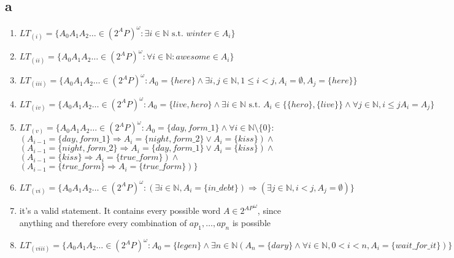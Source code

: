 \documentclass[11pt]{article}
\begin{document}
\subsection{a}
\begin{enumerate}[label=(\roman*)]
\item $LT_{(i)}=\{A_0A_1A_2\dots \in (2^AP)^\omega : \exists i \in \mathbb{N}\text{ s.t. } winter \in A_i\}$
\item $LT_{(ii)}=\{A_0A_1A_2\dots \in (2^AP)^\omega : \forall i \in \mathbb{N}: awesome \in A_i\}$
\item $LT_{(iii)}=\{A_0A_1A_2\dots \in (2^AP)^\omega : A_0 = \{here\} \land \exists i,j \in \mathbb{N}, 1\le i<j, A_i = \emptyset, A_j=\{here\}\}$
\item $LT_{(iv)}=\{A_0A_1A_2\dots \in (2^AP)^\omega : A_0=\{live, hero\} \land \exists i \in \mathbb{N}\text{ s.t. } A_i \in \{\{hero\},\{live\}\} \land \forall j \in \mathbb{N}, i \le j A_i = A_j\}$
\item $LT_{(v)}=\{A_0A_1A_2\dots \in (2^AP)^\omega : A_0 = \{day, form\_1\} \land \forall i \in \mathbb{N}\setminus \{0\}: $\\
\hspace*{1.5cm}$(A_{i-1} = \{day, form\_1\} \Rightarrow A_i = \{night, form\_2\} \lor A_i = \{kiss\}) \land$\\
\hspace*{1.5cm}$(A_{i-1} = \{night, form\_2\} \Rightarrow A_i = \{day, form\_1\} \lor A_i = \{kiss\}) \land$\\
\hspace*{1.5cm}$(A_{i-1}= \{kiss\} \Rightarrow A_i=\{true\_form\})\land$\\
\hspace*{1.5cm}$(A_{i-1}= \{true\_form\} \Rightarrow A_{i}= \{true\_form\})\}$
\item $LT_{(vi)}=\{A_0A_1A_2\dots \in (2^AP)^\omega : (\exists i \in \mathbb{N}, A_i=\{in\_debt\}) \Rightarrow (\exists j \in \mathbb{N}, i < j, A_j = \emptyset)\}$
\item it's a valid statement. It contains every possible word $A \in {2^{AP}}^\omega$, since anything and therefore every combination of $ap_1, \dots , ap_n$ is possible
\item $LT_{(viii)}=\{A_0A_1A_2\dots \in (2^AP)^\omega : A_0 = \{legen\} \land \exists n \in \mathbb{N} (A_n = \{dary\} \land \forall i \in \mathbb{N}, 0 < i < n, A_i = \{wait\_for\_it\} )\}$

\end{enumerate}
\end{document}
